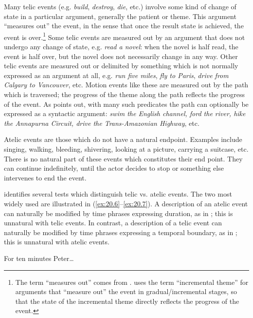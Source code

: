 Many telic events (e.g. \textit{build}, \textit{destroy}, \textit{die}, etc.) involve some kind of change of state in a particular argument, generally the patient or theme. This argument “measures out” the event, in the sense that once the result state is achieved, the event is over.\footnote{The term “measures out” comes from \citet{Tenny1987}. \citet{Dowty1991} uses the term “incremental theme” for arguments that “measure out” the event in gradual/incremental stages, so that the state of the incremental theme directly reflects the progress of the event.} Some telic events are measured out by an argument that does not undergo any change of state, e.g. \textit{read a novel}: when the novel is half read, the event is half over, but the novel does not necessarily change in any way. Other telic events are measured out or delimited by something which is not normally expressed as an argument at all, e.g. \textit{run five miles}, \textit{fly to Paris}, \textit{drive from Calgary to Vancouver}, etc. Motion events like these are measured out by the path which is traversed; the progress of the theme along the path reflects the progress of the event. As \citet{Dowty1991} points out, with many such predicates the path can optionally be expressed as a syntactic argument: \textit{swim the English channel, ford the river, hike the Annapurna Circuit, drive the Trans-Amazonian Highway}, etc.



Atelic events are those which do not have a natural endpoint. Examples include singing, walking, bleeding, shivering, looking at a picture, carrying a suitcase, etc. There is no natural part of these events which constitutes their end point. They can continue indefinitely, until the actor decides to stop or something else intervenes to end the event.



\citet{Dowty1979} identifies several tests which distinguish telic vs. atelic events. The two most widely used are illustrated in (\ref{ex:20.6}--\ref{ex:20.7}). A description of an atelic event can naturally be modified by time phrases expressing duration, as in ; this is unnatural with telic events. In contrast, a description of a telic event can naturally be modified by time phrases expressing a temporal boundary, as in ; this is unnatural with atelic events.


\ea \label{ex:20.6}
For ten minutes Peter…\\
                       \z
\z

